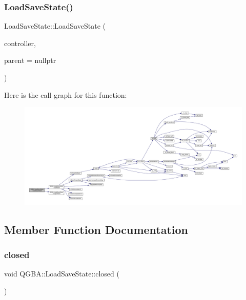 \subsubsection{\texorpdfstring{Load\+Save\+State()}{LoadSaveState()}}
{\footnotesize\ttfamily Load\+Save\+State\+::\+Load\+Save\+State (\begin{DoxyParamCaption}\item[{std\+::shared\+\_\+ptr$<$ \mbox{\hyperlink{class_q_g_b_a_1_1_core_controller}{Core\+Controller}} $>$}]{controller,  }\item[{Q\+Widget $\ast$}]{parent = {\ttfamily nullptr} }\end{DoxyParamCaption})}

Here is the call graph for this function\+:
\nopagebreak
\begin{figure}[H]
\begin{center}
\leavevmode
\includegraphics[width=350pt]{class_q_g_b_a_1_1_load_save_state_a9f873de40c6b36e14eda11ed9ae92581_cgraph}
\end{center}
\end{figure}


\subsection{Member Function Documentation}
\mbox{\label{class_q_g_b_a_1_1_load_save_state_a2f8bf8d005d4c4b37e1f510b069016b9}} 
\subsubsection{\texorpdfstring{closed}{closed}}
{\footnotesize\ttfamily void Q\+G\+B\+A\+::\+Load\+Save\+State\+::closed (\begin{DoxyParamCaption}{ }\end{DoxyParamCaption})\hspace{0.3cm}{\ttfamily [signal]}}

